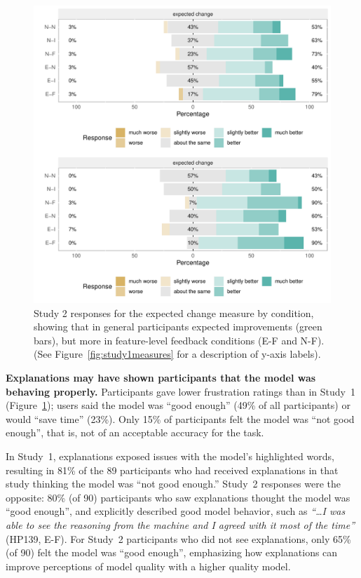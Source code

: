 \begin{figure}[t]
    \centering
    \includegraphics[width=.48\textwidth]{2020_chi_explanation/figures/exp-plots-study2.pdf}
    \caption{Study 2 responses for the expected change measure by condition, showing that in general participants expected improvements (green bars), but more in feature-level feedback conditions (E-F and N-F). (See Figure~\ref{fig:study1measures} for a description of y-axis labels).}
    \label{fig:study2exp}
    \vspace{-10pt}
\end{figure}


\textbf{Explanations may have shown participants that the model was behaving properly.}
%
Participants gave lower frustration ratings than in Study~1 (Figure~\ref{fig:study2exp}); users said the model was ``good enough'' (49\% of all participants) or would ``save time'' (23\%). Only 15\% of participants felt the model was ``not good enough'', that is, not of an acceptable accuracy for the task. 

In Study~1, explanations exposed issues with the model's highlighted words, resulting in 81\% of the 89 participants who had received explanations in that study thinking the model was ``not good enough.'' Study~2 responses were the opposite: 80\% (of 90) participants who saw explanations thought the model was ``good enough'', and  explicitly described good model behavior, such as \textit{``\dots I was able to see the reasoning from the machine and I agreed with it most of the time''} (HP139, E-F). For Study~2 participants who did not see explanations, only 65\% (of 90) felt the model was ``good enough'', emphasizing how explanations can improve perceptions of model quality with a higher quality model. 


